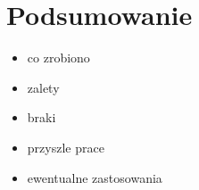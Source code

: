 \section{Podsumowanie}

\begin{itemize}
	\item co zrobiono
	\item zalety
	\item braki
	\item przyszle prace
	\item ewentualne zastosowania
\end{itemize}